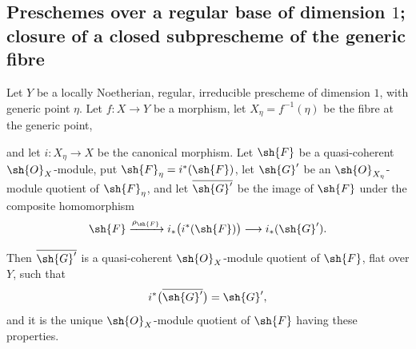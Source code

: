 \subsection{Preschemes over a regular base of dimension
\texorpdfstring{$1$}{1}; closure of a closed subprescheme of the generic
fibre}
\label{subsection:IV.2.8}

\begin{proposition}[2.8.1]
\label{IV.2.8.1}
Let $Y$ be a locally Noetherian, regular, irreducible prescheme of
dimension $1$, with generic point $\eta$. Let $f:X\to Y$ be a
morphism, let $X_\eta=f^{-1}(\eta)$ be the fibre at the generic point,


and let $i:X_\eta\to X$ be the canonical morphism. Let $\sh{F}$ be a
quasi-coherent $\sh{O}_X$-module, put
$\sh{F}_\eta=i^*(\sh{F})$, let $\sh{G}'$ be an
$\sh{O}_{X_\eta}$-module quotient of $\sh{F}_\eta$, and let
$\overline{\sh{G}'}$ be the image of $\sh{F}$ under the composite
homomorphism~
\[
  \sh{F}
    \xrightarrow{\rho_{\sh{F}}}
  i_*\bigl(i^*(\sh{F})\bigr)
    \longrightarrow
  i_*(\sh{G}').
\]

Then $\overline{\sh{G}'}$ is a quasi-coherent
$\sh{O}_X$-module quotient of $\sh{F}$, flat over $Y$, such that
\[
  i^*\bigl(\overline{\sh{G}'}\bigr)=\sh{G}',
\]
and it is the unique $\sh{O}_X$-module quotient of $\sh{F}$ having
these properties.
\end{proposition}

